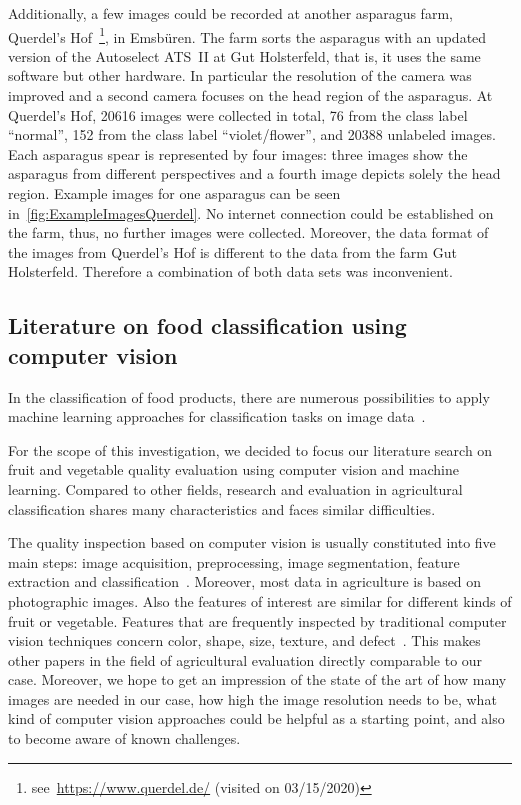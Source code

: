 Additionally, a few images could be recorded at another asparagus farm, Querdel’s Hof~\footnote{see~\url{https://www.querdel.de/} (visited on 03/15/2020)}, in Emsb{\"u}ren. The farm sorts the asparagus with an updated version of the Autoselect ATS~II at Gut Holsterfeld, that is, it uses the same software but other hardware. In particular the resolution of the camera was improved and a second camera focuses on the head region of the asparagus. At Querdel’s Hof, 20616 images were collected in total, 76 from the class label \enquote{normal}, 152 from the class label \enquote{violet/flower}, and 20388 unlabeled images. Each asparagus spear is represented by four images: three images show the asparagus from different perspectives and a fourth image depicts solely the head region. Example images for one asparagus can be seen in~\autoref{fig:ExampleImagesQuerdel}. No internet connection could be established on the farm, thus, no further images were collected. Moreover, the data format of the images from Querdel’s Hof is different to the data from the farm Gut Holsterfeld. Therefore a combination of both data sets was inconvenient.


\subsection{Literature on food classification using computer vision}
\label{sec:Literature}

In the classification of food products, there are numerous possibilities to apply machine learning approaches for classification tasks on image data~\citep{bhargava2018fruits,brosnan2002inspection}.


For the scope of this investigation, we decided to focus our literature search on fruit and vegetable quality evaluation using computer vision and machine learning. Compared to other fields, research and evaluation in agricultural classification shares many characteristics and faces similar difficulties.

The quality inspection based on computer vision is usually constituted into five main steps: image acquisition, preprocessing, image segmentation, feature extraction and classification~\citep{bhargava2018fruits}. Moreover, most data in agriculture is based on photographic images. Also the features of interest are similar for different kinds of fruit or vegetable. Features that are frequently inspected by traditional computer vision techniques concern color, shape, size, texture, and defect~\citep{bhargava2018fruits}. This makes other papers in the field of agricultural evaluation directly comparable to our case. Moreover, we hope to get an impression of the state of the art of how many images are needed in our case, how high the image resolution needs to be, what kind of computer vision approaches could be helpful as a starting point, and also to become aware of known challenges.

